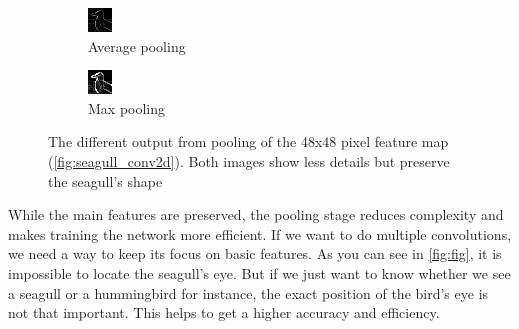 \begin{figure}[h]
\begin{subfigure}{.5\textwidth}
  \centering
  \includegraphics[width=.6\linewidth]{images/Chapter2/avg_pooling.png}
  \caption{Average pooling}
  \label{fig:sfig1}
\end{subfigure}%
\begin{subfigure}{.5\textwidth}
  \centering
  \includegraphics[width=.6\linewidth]{images/Chapter2/max_pooling.png}
  \caption{Max pooling}
  \label{fig:sfig2}
\end{subfigure}
\caption{The different output from pooling of the 48x48 pixel feature map (\autoref{fig:seagull_conv2d}). Both images show less details but preserve the seagull's shape} 
\label{fig:fig}
\end{figure}

While the main features are preserved, the pooling stage reduces complexity and makes training the network more efficient. If we want to do multiple convolutions, we need a way to keep its focus on basic features. As you can see in \autoref{fig:fig}, it is impossible to locate the seagull's eye. But if we just want to know whether we see a seagull or a hummingbird for instance, the exact position of the bird's eye is not that important. This helps to get a higher accuracy and efficiency.
